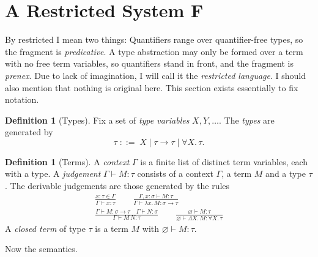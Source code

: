 \documentclass[11pt,a4paper]{report}
\theoremstyle{plain}
\theoremstyle{definition}
\newtheorem{definition}[theorem]{Definition}
\theoremstyle{remark}
\begin{document}
\section{A Restricted System F}
\label{sec:calculus}

By restricted I mean two things: Quantifiers range over quantifier-free types, so the fragment is
\emph{predicative}. A type abstraction may only be formed over a term with no free
term variables, so quantifiers stand in front, and the fragment is
\emph{prenex}. Due to lack of imagination, I will call it the \emph{restricted language}. 
I should also mention that nothing is original here. This section exists essentially to fix notation.

\begin{definition}[Types]
\label{def:types}
Fix a set of \emph{type variables} $X, Y, \dots$. The \emph{types} are
generated by
\[
  \tau \;::=\; X \mid \tau \to \tau \mid \forall X.\, \tau .
\]
\end{definition}

\begin{definition}[Terms]
\label{def:terms}
A \emph{context} $\Gamma$ is a
finite list of distinct term variables, each with a type. A \emph{judgement}
$\Gamma \vdash M : \tau$ consists of a context $\Gamma$, a term $M$ and a
type $\tau$. The derivable judgements are those generated by the rules
\begin{gather*}
  \frac{x : \tau \in \Gamma}{\Gamma \vdash x : \tau}
  \qquad
  \frac{\Gamma, x : \sigma \vdash M : \tau}
       {\Gamma \vdash \lambda x.\, M : \sigma \to \tau}
  \\[1ex]
  \frac{\Gamma \vdash M : \sigma \to \tau \quad \Gamma \vdash N : \sigma}
       {\Gamma \vdash M\,N : \tau}
  \qquad
  \frac{\varnothing \vdash M : \tau}
       {\varnothing \vdash \Lambda X.\, M : \forall X.\, \tau}
\end{gather*}
A \emph{closed term} of type $\tau$ is a term $M$ with
$\varnothing \vdash M : \tau$.
\end{definition}

Now the semantics.
\end{document}
